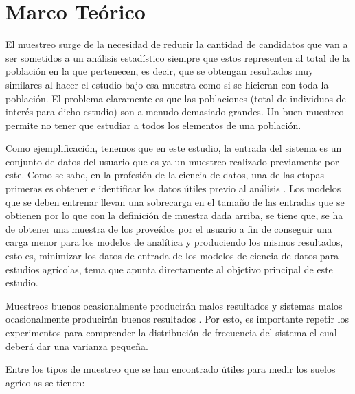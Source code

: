 \documentclass[conference]{IEEEtran}
\begin{document}
\section{Marco Teórico}

El muestreo surge de la necesidad de reducir la cantidad de candidatos que van a ser sometidos a un análisis estadístico siempre que estos representen al total de la población en la que pertenecen, es decir, que se obtengan resultados muy similares al hacer el estudio bajo esa muestra como si se hicieran con toda la población. El problema claramente es que las poblaciones (total de individuos de interés para dicho estudio) son a menudo demasiado grandes. Un buen muestreo permite no tener que estudiar a todos los elementos de una población. 

\bigbreak

Como ejemplificación, tenemos que en este estudio, la entrada del sistema es un conjunto de datos del usuario que es ya un muestreo realizado previamente por este. Como se sabe, en la profesión de la ciencia de datos, una de las etapas primeras es obtener e identificar los datos útiles previo al análisis \cite{university-of-wisconsin-data-science-2021}. Los modelos que se deben entrenar llevan una sobrecarga en el tamaño de las entradas que se obtienen por lo que con la definición de muestra dada arriba, se tiene que, se ha de obtener una muestra de los  proveídos por el usuario a fin de conseguir una carga menor para los modelos de analítica y produciendo los mismos resultados, esto es, minimizar los datos de entrada de los modelos de ciencia de datos para estudios agrícolas, tema que apunta directamente al objetivo principal de este estudio.

\bigbreak

Muestreos buenos ocasionalmente producirán malos resultados y sistemas malos ocasionalmente producirán buenos resultados \cite{gulland-1966}. Por esto, es importante repetir los experimentos para comprender la distribución de frecuencia del sistema el cual deberá dar una varianza pequeña.

\bigbreak

Entre los tipos de muestreo que se han encontrado útiles para medir los suelos agrícolas se tienen:
\end{document}
